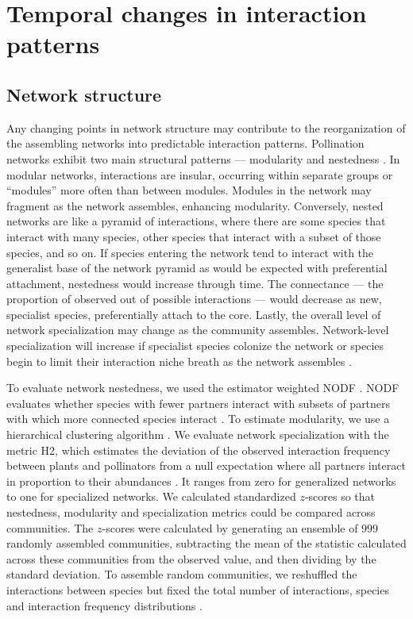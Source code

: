 \documentclass[12pt]{article}
\begin{document}
\section*{Temporal changes in interaction patterns}

\subsection*{Network structure}
Any changing points in network structure may contribute to the
reorganization of the assembling networks into predictable interaction
patterns. Pollination networks exhibit two main structural patterns
--- modularity \citep[e.g.,][]{Olesen2007} and nestedness
\citep[e.g.,][]{Bascompte2006, Bascompte2003}. In modular networks,
interactions are insular, occurring within separate groups or
``modules'' more often than between modules. Modules in the network
may fragment as the network assembles, enhancing
modularity. Conversely, nested networks are like a pyramid of
interactions, where there are some species that interact with many
species, other species that interact with a subset of those species,
and so on. If species entering the network tend to interact with the
generalist base of the network pyramid as would be expected with
preferential attachment, nestedness would increase through time. The
connectance --- the proportion of observed out of possible
interactions --- would decrease as new, specialist species,
preferentially attach to the core. Lastly, the overall level of
network specialization may change as the community
assembles. Network-level specialization will increase if specialist
species colonize the network or species begin to limit their
interaction niche breath as the network assembles
\citep{bluthgen-2006-9}.

To evaluate network nestedness, we used the estimator weighted NODF
\citep{almeida-neto-2008-1227}. NODF evaluates whether species with
fewer partners interact with subsets of partners with which more
connected species interact \citep{almeida-neto-2008-1227}. To estimate
modularity, we use a hierarchical clustering algorithm
\citep{Newman2004, csardi-2006}. We evaluate network specialization with
the metric H2, which estimates the deviation of the observed
interaction frequency between plants and pollinators from a null
expectation where all partners interact in proportion to their
abundances \citep{bluthgen-2006-9}. It ranges from zero for
generalized networks to one for specialized networks.  We calculated
standardized $z$-scores so that nestedness, modularity and
specialization metrics could be compared across communities. The
$z$-scores were calculated by generating an ensemble of $999$ randomly
assembled communities, subtracting the mean of the statistic
calculated across these communities from the observed value, and then
dividing by the standard deviation. To assemble random communities, we
reshuffled the interactions between species but fixed the total number
of interactions, species and interaction frequency distributions
\citep{Galeano2009}.
\end{document}
